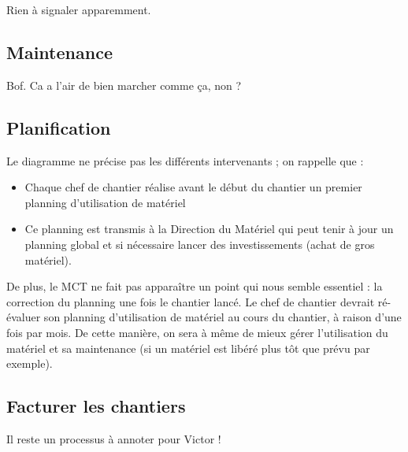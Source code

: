 \documentclass[a4paper]{article}
\begin{document}
Rien à signaler apparemment.


\subsection{Maintenance}

Bof. Ca a l'air de bien marcher comme ça, non ?


\subsection{Planification}

Le diagramme ne précise pas les différents intervenants ; on rappelle que :
\begin{itemize}
\item Chaque chef de chantier réalise avant le début du chantier un premier
planning d'utilisation de matériel
\item Ce planning est transmis à la Direction du Matériel qui peut tenir à
jour un planning global et si nécessaire lancer des investissements (achat
de gros matériel).
\end{itemize}

\vskip 6pt

De plus, le MCT ne fait pas apparaître un point qui nous semble essentiel :
la correction du planning une fois le chantier lancé. Le chef de chantier
devrait ré-évaluer son planning d'utilisation de matériel au cours du
chantier, à raison d'une fois par mois. De cette manière, on sera à même de
mieux gérer l'utilisation du matériel et sa maintenance (si un matériel est
libéré plus tôt que prévu par exemple).


\subsection{Facturer les chantiers}

Il reste un processus à annoter pour Victor !
\end{document}
